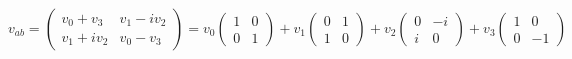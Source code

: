 \begin{equation}
v_{a b}=\left(\begin{array}{cc}
v_{0}+v_{3} & v_{1}-i v_{2} \\
v_{1}+i v_{2} & v_{0}-v_{3}
\end{array}\right)=v_{0}\left(\begin{array}{cc}
1 & 0 \\
0 & 1
\end{array}\right)+v_{1}\left(\begin{array}{cc}
0 & 1 \\
1 & 0
\end{array}\right)+v_{2}\left(\begin{array}{cc}
0 & -i \\
i & 0
\end{array}\right)+v_{3}\left(\begin{array}{cc}
1 & 0 \\
0 & -1
\end{array}\right)
\end{equation}
